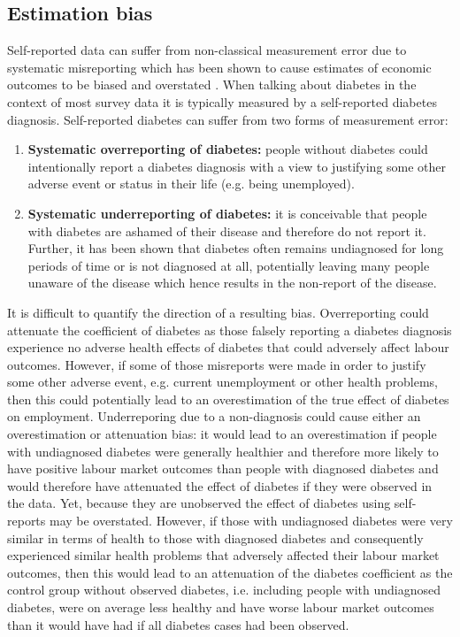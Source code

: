 \documentclass[12pt,english,british]{article}
\begin{document}
\subsection{Estimation bias}

Self-reported data can suffer from non-classical measurement error
due to systematic misreporting which has been shown to cause estimates
of economic outcomes to be biased and overstated \citep{Cawley2015,ONeill2013,Perks2015}.
When talking about diabetes in the context
of most survey data it is typically measured by a self-reported diabetes
diagnosis. Self-reported diabetes can suffer from two forms of measurement
error: 
\begin{enumerate}
\item \textbf{Systematic overreporting of diabetes:} people without diabetes
could intentionally report a diabetes diagnosis with a view to justifying
some other adverse event or status in their life (e.g. being unemployed). 
\item \textbf{Systematic underreporting of diabetes:} it is conceivable
that people with diabetes are ashamed of their disease and therefore
do not report it. Further, it has been shown that diabetes often remains
undiagnosed for long periods of time or is not diagnosed at all, potentially
leaving many people unaware of the disease which hence results in
the non-report of the disease.
\end{enumerate} 

It is difficult to quantify the direction of a resulting bias. Overreporting
could attenuate the coefficient of diabetes as those falsely reporting a diabetes diagnosis experience no adverse health
effects of diabetes that could adversely affect labour outcomes. However, if some of those misreports were
made in order to justify some other adverse event, e.g. current unemployment
or other health problems, then this could potentially lead to an overestimation
of the true effect of diabetes on employment. Underreporing due to
a non-diagnosis could cause either an overestimation or attenuation
bias: it would lead to an overestimation if people with undiagnosed
diabetes were generally healthier and therefore more likely to have
positive labour market outcomes than people with diagnosed diabetes
and would therefore have attenuated the effect of diabetes if they
were observed in the data. Yet, because they are unobserved the effect
of diabetes using self-reports may be overstated. However, if those
with undiagnosed diabetes were very similar in terms of health to those with
diagnosed diabetes and consequently experienced similar health problems
that adversely affected their labour market outcomes, then this would lead to an attenuation of the diabetes coefficient as the control group without observed diabetes, i.e. including people with undiagnosed
diabetes, were on average less healthy and have worse labour market outcomes than it
would have had if all diabetes cases had been observed.
\end{document}
